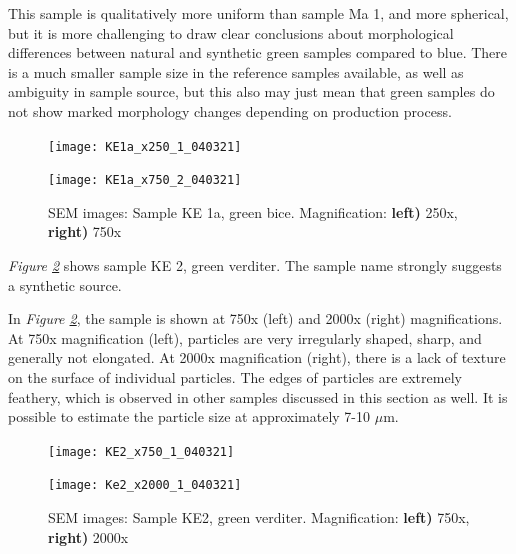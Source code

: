 This sample is qualitatively more uniform than sample Ma 1, and more spherical, but it is more challenging to draw clear conclusions about morphological differences between natural and synthetic green samples compared to blue. There is a much smaller sample size in the reference samples available, as well as ambiguity in sample source, but this also may just mean that green samples do not show marked morphology changes depending on production process.

\begin{figure}[H]
\centering
\begin{minipage}{.45\textwidth}
  \centering
  \texttt{[image: KE1a\_x250\_1\_040321]}
\end{minipage}
\begin{minipage}{.45\textwidth}
  \centering
  \texttt{[image: KE1a\_x750\_2\_040321]}
\end{minipage}
\caption[SEM images: Sample KE 1a, green bice]{SEM images: Sample KE 1a, green bice. Magnification: \textbf{left)} 250x, \textbf{right)} 750x}
\label{fig:KE1a_sem_1}
\end{figure}




\textit{Figure \ref{fig:KE2_sem_1}} shows sample KE 2, green verditer. The sample name strongly suggests a synthetic source. 

In \textit{Figure \ref{fig:KE2_sem_1}}, the sample is shown at 750x (left) and 2000x (right) magnifications. At 750x magnification (left), particles are very irregularly shaped, sharp, and generally not elongated. At 2000x magnification (right), there is a lack of texture on the surface of individual particles. The edges of particles are extremely feathery, which is observed in other samples discussed in this section as well. It is possible to estimate the particle size at approximately 7-10 $\mu$m. 

\begin{figure}[H]
\centering
\begin{minipage}{.45\textwidth}
  \centering
  \texttt{[image: KE2\_x750\_1\_040321]}
\end{minipage}
\begin{minipage}{.45\textwidth}
  \centering
  \texttt{[image: Ke2\_x2000\_1\_040321]}
\end{minipage}
\caption[SEM images: Sample KE2, green verditer]{SEM images: Sample KE2, green verditer. Magnification: \textbf{left)} 750x, \textbf{right)} 2000x}
\label{fig:KE2_sem_1}
\end{figure}


